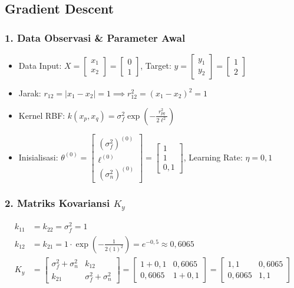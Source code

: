 \documentclass[11pt,a4paper]{article}
\def\boldsymbol#1{#1}%
\def\mathbf#1{#1}%
\begin{document}
\subsection{Gradient Descent}
\label{subsec:gradient_descent}

\subsubsection*{1. Data Observasi \& Parameter Awal}
\begin{itemize}
    \item Data Input: $X = \begin{bmatrix} x_1 \\ x_2 \end{bmatrix} = \begin{bmatrix} 0 \\ 1 \end{bmatrix}$, \quad Target: $\mathbf{y} = \begin{bmatrix} y_1 \\ y_2 \end{bmatrix} = \begin{bmatrix} 1 \\ 2 \end{bmatrix}$
    \item Jarak: $r_{12} = |x_1 - x_2| = 1 \implies r_{12}^2 = (x_1 - x_2)^2 = 1$
    \item Kernel RBF: $k(x_p, x_q) = \sigma_f^2 \exp\left(-\frac{r_{pq}^2}{2\ell^2}\right)$
    \item Inisialisasi: $\boldsymbol{\theta}^{(0)} = \begin{bmatrix} (\sigma_f^2)^{(0)} \\ \ell^{(0)} \\ (\sigma_n^2)^{(0)} \end{bmatrix} = \begin{bmatrix} 1 \\ 1 \\ 0{,}1 \end{bmatrix}$, \quad Learning Rate: $\eta = 0{,}1$
\end{itemize}

\subsubsection*{2. Matriks Kovariansi \texorpdfstring{$K_y$}{Ky}}
\begin{align}
k_{11} &= k_{22} = \sigma_f^2 = 1 \\
k_{12} &= k_{21} = 1 \cdot \exp\left(-\frac{1}{2(1)^2}\right) = e^{-0{,}5} \approx 0{,}6065 \\
K_y &= \begin{bmatrix} \sigma_f^2 + \sigma_n^2 & k_{12} \\ k_{21} & \sigma_f^2 + \sigma_n^2 \end{bmatrix} = \begin{bmatrix} 1 + 0{,}1 & 0{,}6065 \\ 0{,}6065 & 1 + 0{,}1 \end{bmatrix} = \begin{bmatrix} 1{,}1 & 0{,}6065 \\ 0{,}6065 & 1{,}1 \end{bmatrix}
\end{align}
\end{document}
